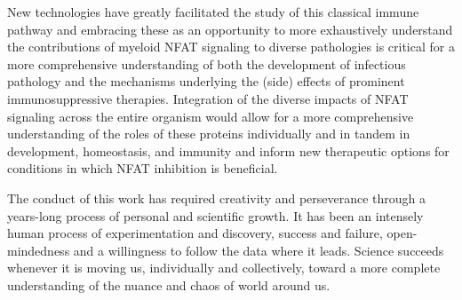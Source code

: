New technologies have greatly facilitated the study of this classical immune pathway and embracing these as an opportunity to more exhaustively understand the contributions of myeloid NFAT signaling to diverse pathologies is critical for a more comprehensive understanding of both the development of infectious pathology and the mechanisms underlying the (side) effects of prominent immunosuppressive therapies. Integration of the diverse impacts of NFAT signaling across the entire organism would allow for a more comprehensive understanding of the roles of these proteins individually and in tandem in development, homeostasis, and immunity and inform new therapeutic options for conditions in which NFAT inhibition is beneficial. 

The conduct of this work has required creativity and perseverance through a years\hyp{}long process of personal and scientific growth. It has been an intensely human process of experimentation and discovery, success and failure, open\hyp{}mindedness and a willingness to follow the data where it leads. Science succeeds whenever it is moving us, individually and collectively, toward a more complete understanding of the nuance and chaos of world around us. 
